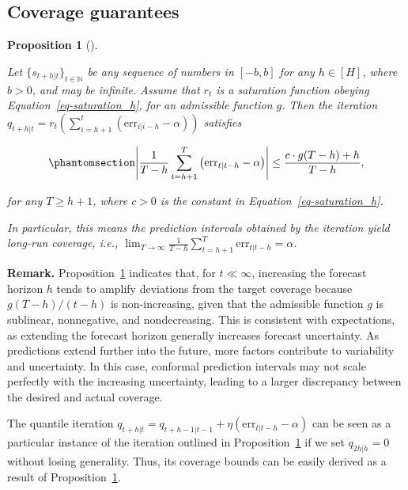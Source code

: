 \documentclass[
  11pt,
  a4paper,
]{article}
\theoremstyle{plain}
\newtheorem{proposition}{Proposition}[section]
\theoremstyle{remark}
\begin{document}
\subsection{Coverage guarantees}\label{coverage-guarantees}

\begin{proposition}[]\protect\hypertarget{prp-cov_rt}{}\label{prp-cov_rt}

Let \(\{s_{t+h|t}\}_{t\in\mathbb{N}}\) be any sequence of numbers in
\([-b, b]\) for any \(h\in[H]\), where \(b>0\), and may be infinite.
Assume that \(r_t\) is a saturation function obeying
Equation~\ref{eq-saturation_h}, for an admissible function \(g\). Then
the iteration
\(q_{t+h|t}=r_t\left(\sum_{i=h+1}^t\left(\mathrm{err}_{i|i-h}-\alpha\right)\right)\)
satisfies

\begin{equation}\phantomsection\label{eq-cov_rt}{
\left|\frac{1}{T-h}\sum_{t=h+1}^{T}\left(\mathrm{err}_{t|t-h}-\alpha\right)\right| \leq \frac{c \cdot g(T-h) + h}{T-h},
}\end{equation}

for any \(T \geq h+1\), where \(c>0\) is the constant in
Equation~\ref{eq-saturation_h}.

In particular, this means the prediction intervals obtained by the
iteration yield long-run coverage, i.e.,
\(\lim _{T \rightarrow \infty} \frac{1}{T-h} \sum_{t=h+1}^T \mathrm{err}_{t|t-h} = \alpha\).

\end{proposition}

\textbf{Remark.} Proposition~\ref{prp-cov_rt} indicates that, for
\(t \ll \infty\), increasing the forecast horizon \(h\) tends to amplify
deviations from the target coverage because \(g(T-h)/(t-h)\) is
non-increasing, given that the admissible function \(g\) is sublinear,
nonnegative, and nondecreasing. This is consistent with expectations, as
extending the forecast horizon generally increases forecast uncertainty.
As predictions extend further into the future, more factors contribute
to variability and uncertainty. In this case, conformal prediction
intervals may not scale perfectly with the increasing uncertainty,
leading to a larger discrepancy between the desired and actual coverage.

The quantile iteration
\(q_{t+h|t}=q_{t+h-1|t-1}+\eta \left(\mathrm{err}_{t|t-h}-\alpha\right)\)
can be seen as a particular instance of the iteration outlined in
Proposition~\ref{prp-cov_rt} if we set \(q_{2h|h}=0\) without losing
generality. Thus, its coverage bounds can be easily derived as a result
of Proposition~\ref{prp-cov_rt}.
\end{document}

